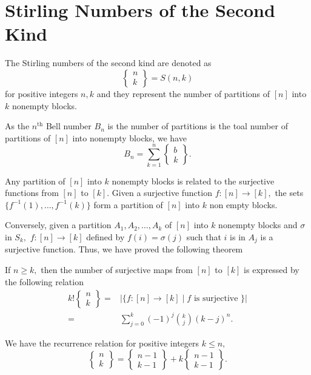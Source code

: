 \section{Stirling Numbers of the Second Kind}

\begin{definition}
	The Stirling numbers of the second kind are denoted as 
	$$ \begin{Bmatrix} n\\k \end{Bmatrix} = S(n,k)$$
	for positive integers $n,k$ and they represent the
	number of partitions of $[n]$ into $k$ nonempty blocks.
\end{definition}


\begin{remark}
	As the $n^\text{th}$ Bell number $B_n$ is the number of partitions is the toal number of partitions of $[n]$ into nonempty blocks, we have
	$$B_n = \sum_{k=1}^{n} \begin{Bmatrix} b\\k\end{Bmatrix}.$$ 
\end{remark}



Any partition of $[n]$ into $k$ nonempty blocks is related to the
surjective functions from $[n]$ to $[k].$ Given a surjective function
$f \colon [n] \to [k],$ the sets $\{ f^{-1}(1), \dotsc, f^{-1}(k)\}$
form a partition of $[n]$ into $k$ non empty blocks.

Conversely, given a partition $A_1, A_2, \dotsc, A_k$ of $[n]$ into $k$ nonempty blocks and $\sigma$ in $S_k,$ $f \colon [n] \to [k]$ defined by
$f(i) = \sigma(j)$ such that $i$ is in $A_{j}$ is a surjective function.
Thus, we have proved the following theorem
\begin{theorem}
	If $n \geq k,$ then the number of surjective maps from
	$[n]$ to $[k]$ is expressed by the following relation
	\begin{align*}
		k! \begin{Bmatrix} n\\k\end{Bmatrix}
		={}& \lvert \{ f\colon [n] \to [k] \; | \;
		f \text{ is surjective } \} \rvert \\
		={}& \sum_{j=0}^{k} (-1)^j \binom{k}{j} (k-j)^n.
	\end{align*}
\end{theorem}


\begin{remark}
	We have the recurrence relation for positive integers $k \leq n,$
	$$ \begin{Bmatrix} n\\k\end{Bmatrix} = 
	\begin{Bmatrix}n-1\\k-1 \end{Bmatrix} + 
	k \begin{Bmatrix}n-1\\k-1 \end{Bmatrix}. $$
\end{remark}


